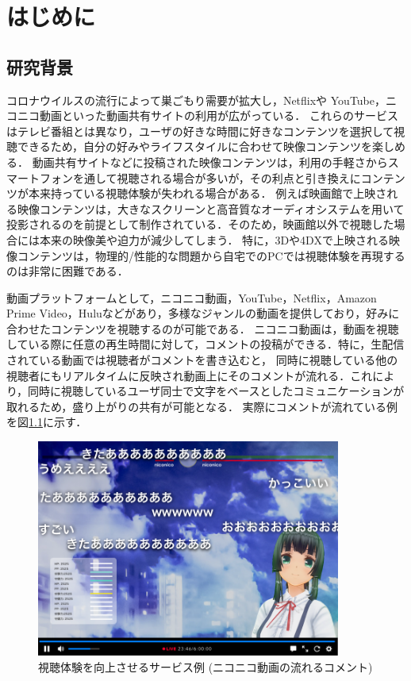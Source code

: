 \chapter{はじめに}
\thispagestyle{myheadings}

\section{研究背景}
コロナウイルスの流行によって巣ごもり需要が拡大し，Netflixや YouTube，ニコニコ動画といった動画共有サイトの利用が広がっている．
これらのサービスはテレビ番組とは異なり，ユーザの好きな時間に好きなコンテンツを選択して視聴できるため，自分の好みやライフスタイルに合わせて映像コンテンツを楽しめる．
動画共有サイトなどに投稿された映像コンテンツは，利用の手軽さからスマートフォンを通して視聴される場合が多いが，その利点と引き換えにコンテンツが本来持っている視聴体験が失われる場合がある．
例えば映画館で上映される映像コンテンツは，大きなスクリーンと高音質なオーディオシステムを用いて投影されるのを前提として制作されている．そのため，映画館以外で視聴した場合には本来の映像美や迫力が減少してしまう．
特に，3Dや4DXで上映される映像コンテンツは，物理的/性能的な問題から自宅でのPCでは視聴体験を再現するのは非常に困難である．

動画プラットフォームとして，ニコニコ動画，YouTube，Netflix，Amazon Prime Video，Huluなどがあり，多様なジャンルの動画を提供しており，好みに合わせたコンテンツを視聴するのが可能である．
ニコニコ動画は，動画を視聴している際に任意の再生時間に対して，コメントの投稿ができる．特に，生配信されている動画では視聴者がコメントを書き込むと，
同時に視聴している他の視聴者にもリアルタイムに反映され動画上にそのコメントが流れる．これにより，同時に視聴しているユーザ同士で文字をベースとしたコミュニケーションが取れるため，盛り上がりの共有が可能となる．
実際にコメントが流れている例を図\ref{nikoniko}に示す．

\begin{figure}[H]
    \centering
    \includegraphics[width=10cm]{images/chapter1/nikoniko_grafu.png}
    \caption{視聴体験を向上させるサービス例 (ニコニコ動画の流れるコメント)}
    \label{nikoniko}
\end{figure}

